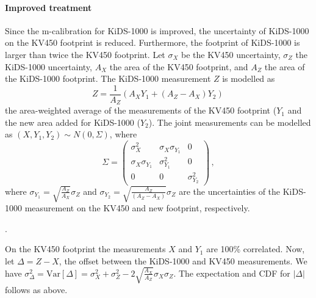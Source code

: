 \begin{appendix}
\paragraph{Improved treatment}
Since the m-calibration for KiDS-1000 is improved, the uncertainty of KiDS-1000 on the KV450 footprint is reduced. Furthermore, the footprint of KiDS-1000 is larger than twice the KV450 footprint. 
Let $\sigma_X$ be the KV450 uncertainty, $\sigma_Z$ the KiDS-1000 uncertainty, $A_X$ the area of the KV450 footprint, and $A_Z$ the area of the KiDS-1000 footprint. 
The KiDS-1000 measurement $Z$ is modelled as 
\begin{equation}
  Z = \frac{1}{A_Z}\left(A_X Y_1 + (A_Z-A_X) Y_2\right) \,
\end{equation}
the area-weighted average of the measurements of the KV450 footprint ($Y_1$ and the new area added for KiDS-1000 ($Y_2$). 
The joint measurements can be modelled as $(X, Y_1, Y_2)\sim N(0,\Sigma)$, where
\begin{equation}
  \Sigma = \begin{pmatrix}
              \sigma_X^2           & \sigma_X\sigma_{Y_1} & 0\\
              \sigma_X\sigma_{Y_1} & \sigma_{Y_1}^2       & 0\\
              0                    & 0                    & \sigma_{Y_2}^2
            \end{pmatrix}\, ,
\end{equation}
where $\sigma_{Y_1}=\sqrt{\frac{A_Z}{A_X}}\sigma_Z$ and $\sigma_{Y_2}=\sqrt{\frac{A_Z}{(A_Z-A_X)}}\sigma_Z$ are the uncertainties of the KiDS-1000 measurement on the KV450 and new footprint, respectively.  

.


On the KV450 footprint the measurements $X$ and $Y_1$ are 100\% correlated. 
Now, let $\Delta = Z - X$, the offset between the KiDS-1000 and KV450 measurements. We have $\sigma_\Delta^2 = \mathrm{Var}[\Delta] = \sigma_X^2 + \sigma_Z^2 - 2\sqrt{\frac{A_X}{A_Z}}\sigma_X\sigma_Z$. The expectation and CDF for $|\Delta|$ follows as above.


\end{appendix}